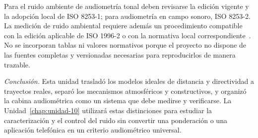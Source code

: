 Para el ruido ambiente de audiometría tonal deben revisarse la edición
vigente y la adopción local de ISO 8253-1; para audiometría en campo sonoro,
ISO 8253-2. La medición de ruido ambiental requiere además un procedimiento
compatible con la edición aplicable de ISO 1996-2 o con la normativa local
correspondiente~\cite{iso8253_1_2010,ansiS31_2023,iso8253_2_2009,iso1996_2_2017}. No se incorporan tablas ni valores normativos porque
el proyecto no dispone de las fuentes completas y versionadas necesarias para
reproducirlos de manera trazable.

\bigskip
\noindent\emph{Conclusión.} Esta unidad trasladó los modelos ideales de
distancia y directividad a trayectos reales, separó los mecanismos atmosféricos
y constructivos, y organizó la cabina audiométrica como un sistema que debe
medirse y verificarse. La Unidad~\ref{chap:unidad-10} utilizará estas
distinciones para estudiar
la caracterización y el control del ruido sin convertir una ponderación o una
aplicación telefónica en un criterio audiométrico universal.

